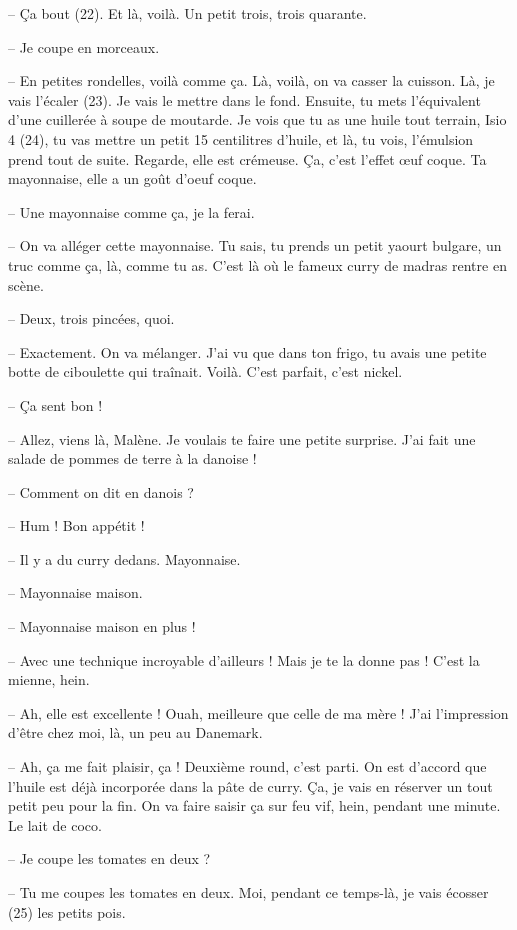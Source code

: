 \documentclass[11pt, french]{report}
\begin{document}
-- Ça bout (22). Et là, voilà. Un petit trois, trois quarante.

-- Je coupe en morceaux.

-- En petites rondelles, voilà comme ça. Là, voilà, on va casser la cuisson. Là, je
vais l’écaler (23). Je vais le mettre dans le fond. Ensuite, tu mets l’équivalent
d’une cuillerée à soupe de moutarde. Je vois que tu as une huile tout terrain,
Isio 4 (24), tu vas mettre un petit 15 centilitres d’huile, et là, tu vois,
l’émulsion prend tout de suite. Regarde, elle est crémeuse. Ça, c’est l’effet œuf
coque. Ta mayonnaise, elle a un goût d’oeuf coque.

-- Une mayonnaise comme ça, je la ferai.

-- On va alléger cette mayonnaise. Tu sais, tu prends un petit yaourt bulgare, un
truc comme ça, là, comme tu as. C’est là où le fameux curry de madras rentre en
scène.

-- Deux, trois pincées, quoi.

-- Exactement. On va mélanger. J’ai vu que dans ton frigo, tu avais une petite
botte de ciboulette qui traînait. Voilà. C’est parfait, c’est nickel.

-- Ça sent bon !

-- Allez, viens là, Malène. Je voulais te faire une petite surprise. J’ai fait
une salade de pommes de terre à la danoise !

-- Comment on dit en danois ?

-- Hum ! Bon appétit !

-- Il y a du curry dedans. Mayonnaise.

-- Mayonnaise maison.

-- Mayonnaise maison en plus !

-- Avec une technique incroyable d’ailleurs ! Mais je te la donne pas ! C’est la
mienne, hein.

-- Ah, elle est excellente ! Ouah, meilleure que celle de ma mère ! J’ai
l’impression d’être chez moi, là, un peu au Danemark.

-- Ah, ça me fait plaisir, ça ! Deuxième round, c’est parti. On est d’accord que
l’huile est déjà incorporée dans la pâte de curry. Ça, je vais en réserver un tout
petit peu pour la fin. On va faire saisir ça sur feu vif, hein, pendant une minute.
Le lait de coco.

-- Je coupe les tomates en deux ?

-- Tu me coupes les tomates en deux. Moi, pendant ce temps-là, je vais écosser (25)
les petits pois.
\end{document}
